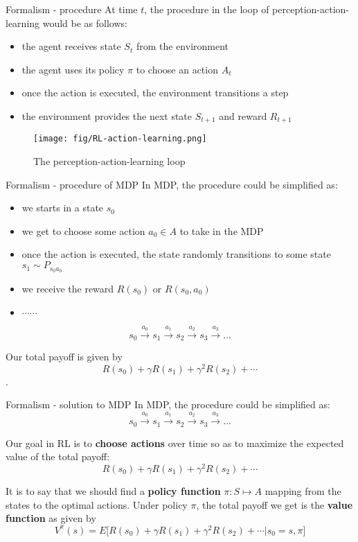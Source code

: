 \documentclass[10pt]{beamer}
\begin{document}
\begin{frame}{Formalism - procedure}
  At time $t$, the procedure in the loop of perception-action-learning would be as follows:
  \begin{itemize}
    \item the agent receives state $S_t$ from the environment
    \item the agent uses its policy $\pi$ to choose an action $A_t$
    \item once the action is executed, the environment transitions a step
    \item the environment provides the next state $S_{t+1}$ and reward $R_{t+1}$
  \end{itemize}

  \begin{figure}[htbp]
    \centering
    \texttt{[image: fig/RL-action-learning.png]}
    \caption{The perception-action-learning loop}
  \end{figure}

\end{frame}

\begin{frame}{Formalism - procedure of MDP}
  In MDP, the procedure could be simplified as:
  \begin{itemize}
    \item we starts in a state $s_0$
    \item we get to choose some action $a_0\in A$ to take in the MDP
    \item once the action is executed, the state randomly transitions to some state $s_1\sim P_{s_0 a_0}$
    \item we receive the reward $R(s_0)$ or $R(s_0, a_0)$
    \item $\cdots \cdots$
  \end{itemize}

  $$s_0 \overset{a_0}{\longrightarrow} s_1 \overset{a_1}{\longrightarrow} s_2 \overset{a_2}{\longrightarrow} s_3 \overset{a_3}{\longrightarrow} \dots$$

  Our total payoff is given by $$R(s_0) + \gamma R(s_1) + \gamma^2 R(s_2) + \cdots$$. 

\end{frame}

\begin{frame}{Formalism - solution to MDP}
  In MDP, the procedure could be simplified as: $$s_0 \overset{a_0}{\longrightarrow} s_1 \overset{a_1}{\longrightarrow} s_2 \overset{a_2}{\longrightarrow} s_3 \overset{a_3}{\longrightarrow} \dots$$

  Our goal in RL is to \textbf{choose actions} over time so as to \alert{maximize the expected value} of the total payoff: $$R(s_0) + \gamma R(s_1) + \gamma^2 R(s_2) + \cdots$$

  It is to say that we should find a \textbf{policy function} $\pi : S\mapsto A$ mapping from the states to the optimal actions. Under policy $\pi$, the total payoff we get is the \textbf{value function} as given by $$V^{\pi}(s)=E\bigl[R(s_0) + \gamma R(s_1) + \gamma^2 R(s_2) + \cdots|s_0=s, \pi\bigr]$$

\end{frame}
\end{document}
